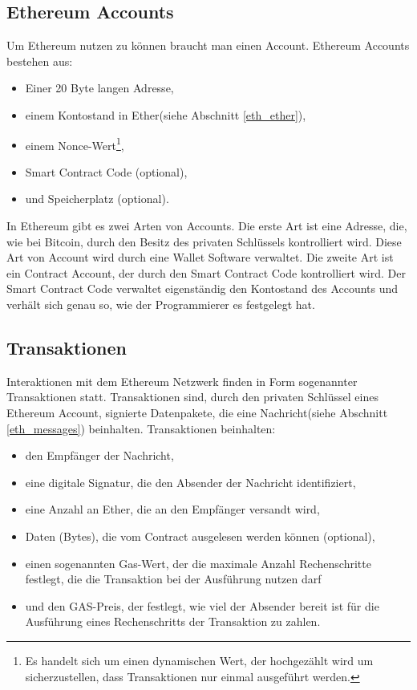 \subsection{Ethereum Accounts}
Um Ethereum nutzen zu können braucht man einen Account. Ethereum Accounts bestehen aus:\\
\begin{itemize}
\item Einer 20 Byte langen Adresse,
\item einem Kontostand in Ether(siehe Abschnitt \ref{eth_ether}),
\item einem Nonce-Wert\footnote{Es handelt sich um einen dynamischen Wert, der hochgezählt wird um sicherzustellen, dass Transaktionen nur einmal ausgeführt werden.},
\item Smart Contract Code (optional),
\item und Speicherplatz (optional).
\end{itemize} In Ethereum gibt es zwei Arten von Accounts. Die erste Art ist eine Adresse, die, wie bei Bitcoin, durch den Besitz des privaten Schlüssels kontrolliert wird. Diese Art von Account wird durch eine Wallet Software verwaltet. Die zweite Art ist ein  Contract Account, der durch den Smart Contract Code kontrolliert wird. Der Smart Contract Code verwaltet eigenständig den Kontostand des Accounts und verhält sich genau so, wie der Programmierer es festgelegt hat.

\subsection{Transaktionen}
Interaktionen mit dem Ethereum Netzwerk finden in Form sogenannter Transaktionen statt. Transaktionen sind, durch den privaten Schlüssel eines Ethereum Account, signierte Datenpakete, die eine Nachricht(siehe Abschnitt \ref{eth_messages}) beinhalten. Transaktionen beinhalten:
\begin{itemize}
\item den Empfänger der Nachricht,
\item eine digitale Signatur, die den Absender der Nachricht identifiziert,
\item eine Anzahl an Ether, die an den Empfänger versandt wird,
\item Daten (Bytes), die vom Contract ausgelesen werden können (optional),
\item einen sogenannten Gas-Wert, der die maximale Anzahl Rechenschritte festlegt, die die Transaktion bei der Ausführung nutzen darf
\item und den GAS-Preis, der festlegt, wie viel der Absender bereit ist für die Ausführung eines Rechenschritts der Transaktion zu zahlen.
\end{itemize}

